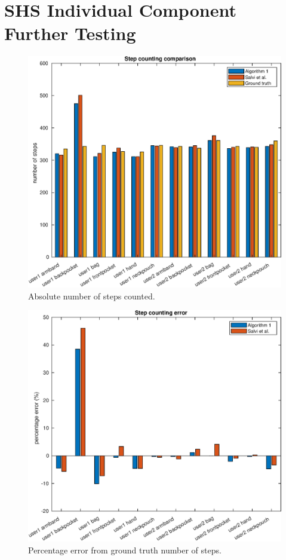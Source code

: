 \chapter{SHS Individual Component Further Testing}

	\begin{figure}[htbp]
	\centering
	\includegraphics[width=0.7\linewidth]{images/20201112_1347_step_counting_comparison_1}
	\setlength{\belowcaptionskip}{-20pt}
	\caption{Absolute number of steps counted.}
	\label{fig:app_sd_abs_comparison}
\end{figure}
\restoregeometry

\begin{figure}[H]
	\centering
	\includegraphics[width=0.7\linewidth]{images/20201112_1401_Step_counting_error}
	\caption{Percentage error from ground truth number of steps. }
	\setlength{\belowcaptionskip}{-2cm}
	\label{fig:app_sd_percent_comparison}
\end{figure}

